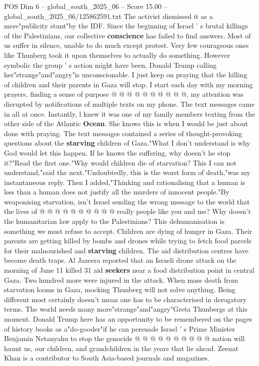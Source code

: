 \begin{textsample}{POS Dim 6 – global\_south\_2025\_06 – Score 15.00 – global\_south\_2025\_06/125862591.txt}
The activist dismissed it as a mere"publicity stunt"by the IDF.
Since the beginning of Israel ' s brutal killings of the Palestinians, our collective \textbf{conscience} has failed to find answers.
Most of us suffer in silence, unable to do much except protest.
Very few courageous ones like Thunberg took it upon themselves to actually do something.
However symbolic the group ' s action might have been, Donald Trump calling her"strange"and"angry"is unconscionable.
I just keep on praying that the killing of children and their parents in Gaza will stop.
I start each day with my morning prayers, finding a sense of purpose @ @ @ @ @ @ @ @ @ @, my attention was disrupted by notifications of multiple texts on my phone.
The text messages came in all at once.
Instantly, l knew it was one of my family members texting from the other side of the Atlantic \textbf{Ocean}.
She knows this is when I would be just about done with praying.
The text messages contained a series of thought-provoking questions about the \textbf{starving} children of Gaza."What I don't understand is why God would let this happen.
If he knows the suffering, why doesn't he stop it?"Read the first one."Why would children die of starvation?
This I can not understand,"said the next."Undoubtedly, this is the worst form of death,"was my instantaneous reply.
Then I added,"Thinking and rationalising that a human is less than a human does not justify all the murders of innocent people."By weaponising starvation, isn't Israel sending the wrong message to the world that the lives of @ @ @ @ @ @ @ @ @ @ really people like you and me?
Why doesn't the humanitarian law apply to the Palestinians?
This dehumanisation is something we must refuse to accept.
Children are dying of hunger in Gaza.
Their parents are getting killed by bombs and drones while trying to fetch food parcels for their malnourished and \textbf{starving} children.
The aid distribution centres have become death traps.
Al Jazeera reported that an Israeli drone attack on the morning of June 11 killed 31 aid \textbf{seekers} near a food distribution point in central Gaza.
Two hundred more were injured in the attack.
When mass death from starvation looms in Gaza, mocking Thunberg will not solve anything.
Being different most certainly doesn't mean one has to be characterised in derogatory terms.
The world needs many more"strange"and"angry"Greta Thunbergs at this moment.
Donald Trump here has an opportunity to be remembered on the pages of history books as a"do-gooder"if he can persuade Israel ' s Prime Minister Benjamin Netanyahu to stop the genocide @ @ @ @ @ @ @ @ @ @ nation will haunt us, our children, and grandchildren in the years that lie ahead.
Zeenat Khan is a contributor to South Asia-based journals and magazines.

\end{textsample}
